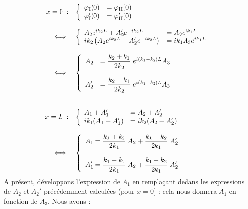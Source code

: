 \documentclass{book}
\begin{document}
$$
\begin{array}{rl}
  x=0\; : &\left\{
    \begin{array}{ll}
      \varphi_{\mathrm{I}}(0) &= \varphi_{\mathrm{II}}(0) \\
      \varphi_{\mathrm{I}}'(0) &= \varphi_{\mathrm{II}}'(0) \\
    \end{array}
  \right. \\
  \strut \\
  \iff  
  &\left\{
    \begin{array}{ll}
      A_2 e^{ik_2L} +A_2'e^{-ik_2L} &= A_3 e^{ik_1L} \\
      ik_2\left(A_2 e^{ik_2L} -A_2'e^{-ik_2L}\right) &= ik_1A_3 e^{ik_1L} \\
    \end{array}
  \right. \\
  \strut \\
  \iff  
  &\left\{
    \begin{array}{ll}
      A_2 &= \dfrac{k_2+k_1}{2k_2} \; e^{i(k_1-k_2)L} A_3 \\
      \strut \\
      A_2' &= \dfrac{k_2-k_1}{2k_2} \; e^{i(k_1+k_2)L} A_3 \\
    \end{array}
  \right. \\
  \strut \\
  \strut \\
  x=L \; : &\left\{ 
    \begin{array}{ll}
      A_1 + A_1' &= A_2 + A_2' \\
      ik_1(A_1 - A_1') &= ik_2(A_2 - A_2') \\
    \end{array}
  \right. \\
  \strut \\
  \iff
  &\left\{ 
    \begin{array}{ll}
      A_1 = \dfrac{k_1+k_2}{2k_1} \; A_2 + \dfrac{k_1-k_2}{2k_1} \; A_2' \\
      \strut \\
      A_1' = \dfrac{k_1-k_2}{2k_1} \; A_2 + \dfrac{k_1+k_2}{2k_1} \; A_2' \\
    \end{array}
  \right. \\
\end{array}
$$
A présent, développons l'expression de $A_1$ en remplaçant dedans les expressions de $A_2$ et $A_2'$ précédemment calculées (pour $x=0$) : cela nous donnera $A_1$ en fonction de $A_3$. Nous avons :
\end{document}

